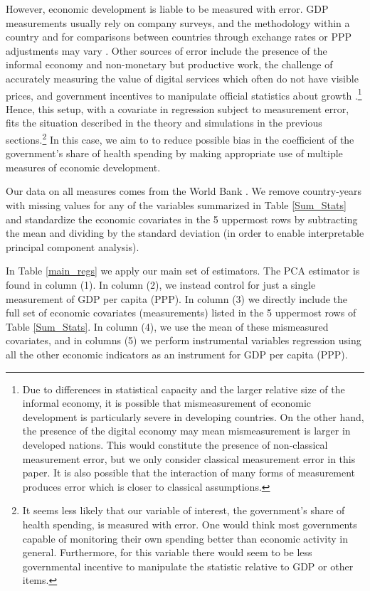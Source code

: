 \documentclass[10pt]{article}
\begin{document}
        However, economic development is liable to be measured with error. GDP measurements usually rely on company surveys, and the methodology within a country and for comparisons between countries through exchange rates or PPP adjustments may vary \citep{grishin_main_2019}. Other sources of error include the presence of the informal economy and non-monetary but productive work, the challenge of accurately measuring the value of digital services which often do not have visible prices, and government incentives to manipulate official statistics about growth \citep{charmes_informal_2012,ahmad_can_2017,nakamura_are_2016}.\footnote{Due to differences in statistical capacity and the larger relative size of the informal economy, it is possible that mismeasurement of economic development is particularly severe in developing countries. On the other hand, the presence of the digital economy may mean mismeasurement is larger in developed nations. This would constitute the presence of non-classical measurement error, but we only consider classical measurement error in this paper. It is also possible that the interaction of many forms of measurement produces error which is closer to classical assumptions.} Hence, this setup, with a covariate in regression subject to measurement error, fits the situation described in the theory and simulations in the previous sections.\footnote{It seems less likely that our variable of interest, the government's share of health spending, is measured with error. One would think most governments capable of monitoring their own spending better than economic activity in general. Furthermore, for this variable there would seem to be less governmental incentive to manipulate the statistic relative to GDP or other items.} In this case, we aim to to reduce possible bias in the coefficient of the government's share of health spending by making appropriate use of multiple measures of economic development.

        Our data on all measures comes from the World Bank \citep{the_world_bank_indicators_2021}. We remove country-years with missing values for any of the variables summarized in Table \ref{Sum_Stats} and standardize the economic covariates in the 5 uppermost rows by subtracting the mean and dividing by the standard deviation (in order to enable interpretable principal component analysis).

        

        In Table \ref{main_regs} we apply our main set of estimators. The PCA estimator is found in column (1). In column (2), we instead control for just a single measurement of GDP per capita (PPP). In column (3) we directly include the full set of economic covariates (measurements) listed in the 5 uppermost rows of Table \ref{Sum_Stats}. In column (4), we use the mean of these mismeasured covariates, and in columns (5) we perform instrumental variables regression using all the other economic indicators as an instrument for GDP per capita (PPP).
\end{document}
